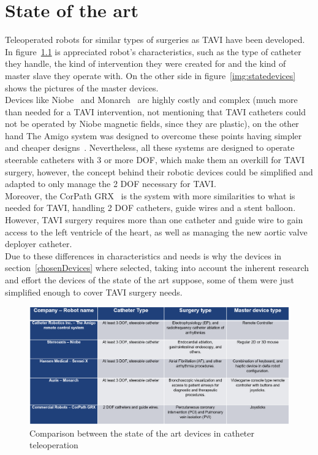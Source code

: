 
\chapter{State of the art }\label{sec:stateoftheart}

Teleoperated robots for similar types of surgeries as TAVI have been developed. In figure~\ref{img:statetable} is appreciated robot's characteristics, such as the type of catheter they handle, the kind of intervention they were created for and the kind of master slave they operate with. On the other side in figure~\ref{img:statedevices} shows the pictures of the master devices.\\

Devices like Niobe~\cite{stereoaxis} and Monarch~\cite{monarch} are highly costly and complex (much more than needed for a TAVI intervention, not mentioning that TAVI catheters could not be operated by Niobe magnetic fields, since they are plastic), on the other hand The Amigo system was designed to overcome these points having simpler and cheaper designs~\cite{amigo}. Nevertheless, all these systems are designed to operate steerable catheters with 3 or more DOF, which make them an overkill for TAVI surgery, however, the concept behind their robotic devices could be simplified and adapted to only manage the 2 DOF necessary for TAVI.\\

Moreover, the CorPath GRX~\cite{corepath} is the system with more similarities to what is needed for TAVI, handling 2 DOF catheters, guide wires and a stent balloon. However, TAVI surgery requires more than one catheter and guide wire to gain access to the left ventricle of the heart, as well as managing the new aortic valve deployer catheter.\\

Due to these differences in characteristics and needs is why the devices in section~\ref{chosenDevices} where selected, taking into account the inherent research and effort the devices of the state of the art suppose, some of them were just simplified enough to cover TAVI surgery needs.\\

\begin{figure}[ht]
   \centering
   \includegraphics[width=1.0\textwidth]{img/statetable.PNG}
   \caption{Comparison between the state of the art devices in catheter teleoperation}
   \label{img:statetable}
\end{figure}

